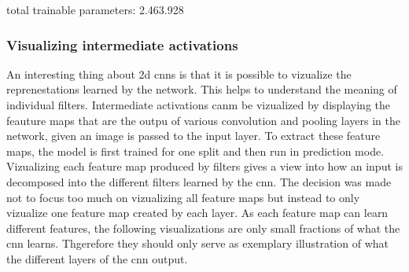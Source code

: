 total trainable parameters: 2.463.928

\subsubsection{Visualizing intermediate activations}

An interesting thing about 2d cnns is that it is possible to vizualize the reprenestations learned by the network. This helps to understand the meaning of individual filters. Intermediate activations canm be vizualized by displaying the feauture maps that are the outpu of various convolution and pooling layers in the network, given an image is passed to the input layer.  To extract these feature maps, the model is first trained for one split and then run in prediction mode. Vizualizing each feature map produced by filters gives a view into how an input is decomposed into the different filters learned by the cnn. The decision was made not to focus too much on vizualizing all feature maps but instead to only vizualize one feature map created by each layer. As each feature map can learn different features, the following visualizations are only small fractions of what the cnn learns. Thgerefore they should only serve as exemplary illustration of what the different layers of the cnn output.


